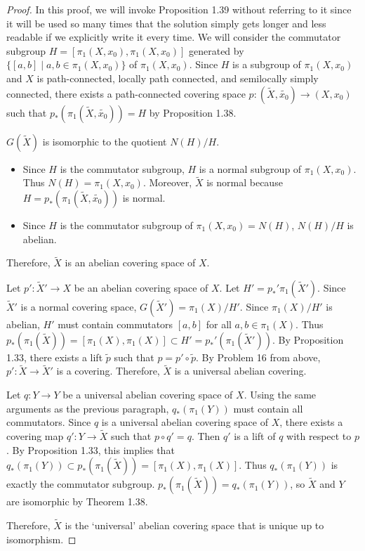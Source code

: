 \documentclass[12pt, psamsfonts]{amsart}
\theoremstyle{definition}
\theoremstyle{remark}
\numberwithin{equation}{section}
\begin{document}
\begin{proof}
  In this proof, we will invoke Proposition 1.39 without referring to it since it will be used so many times that the solution simply gets longer and less readable if we explicitly write it every time.
  We will consider the commutator subgroup $H = [\pi_1(X, x_0), \pi_1(X, x_0)]$ generated by $\{ [a, b] \mid a, b \in \pi_1(X, x_0) \}$ of $\pi_1(X, x_0)$.
  Since $H$ is a subgroup of $\pi_1(X, x_0)$ and $X$ is path-connected, locally path connected, and semilocally simply connected, there exists a path-connected covering space $p: (\tilde{X}, \tilde{x_0}) \rightarrow (X, x_0)$ such that $p_*(\pi_1(\tilde{X}, \tilde{x_0})) = H$ by Proposition 1.38.

  $G(\tilde{X})$ is isomorphic to the quotient $N(H) / H$.
  \begin{itemize}
    \item
      Since $H$ is the commutator subgroup, $H$ is a normal subgroup of $\pi_1(X, x_0)$.
      Thus $N(H) = \pi_1(X, x_0)$.
      Moreover, $\tilde{X}$ is normal because $H = p_*(\pi_1(\tilde{X}, \tilde{x_0}))$ is normal.
    \item
      Since $H$ is the commutator subgroup of $\pi_1(X, x_0) = N(H)$, $N(H) / H$ is abelian.
  \end{itemize}
  Therefore, $\tilde{X}$ is an abelian covering space of $X$.

  Let $p': \tilde{X}' \rightarrow X$ be an abelian covering space of $X$.
  Let $H' = p_*'\pi_1(\tilde{X}')$.
  Since $\tilde{X}'$ is a normal covering space, $G(\tilde{X}') = \pi_1(X) / H'$.
  Since $\pi_1(X) / H'$ is abelian, $H'$ must contain commutators $[a, b]$ for all $a, b \in \pi_1(X)$.
  Thus $p_*(\pi_1(\tilde{X})) = [\pi_1(X), \pi_1(X)] \subset H' = p_*'(\pi_1(\tilde{X}'))$.
  By Proposition 1.33, there exists a lift $\tilde{p}$ such that $p = p' \circ \tilde{p}$.
  By Problem 16 from above, $p': \tilde{X} \rightarrow \tilde{X}'$ is a covering.
  Therefore, $\tilde{X}$ is a universal abelian covering.

  Let $q: Y \rightarrow Y$ be a universal abelian covering space of $X$.
  Using the same arguments as the previous paragraph, $q_*(\pi_1(Y))$ must contain all commutators.
  Since $q$ is a universal abelian covering space of $X$, there exists a covering map $q': Y \rightarrow \tilde{X}$ such that $p \circ q' = q$.
  Then $q'$ is a lift of $q$ with respect to $p$.
  By Proposition 1.33, this implies that $q_*(\pi_1(Y)) \subset p_*(\pi_1(\tilde{X})) = [\pi_1(X), \pi_1(X)]$.
  Thus $q_*(\pi_1(Y))$ is exactly the commutator subgroup.
  $p_*(\pi_1(\tilde{X})) = q_*(\pi_1(Y))$, so $\tilde{X}$ and $Y$ are isomorphic by Theorem 1.38.

  Therefore, $\tilde{X}$ is the `universal' abelian covering space that is unique up to isomorphism.

\end{proof}
\end{document}
